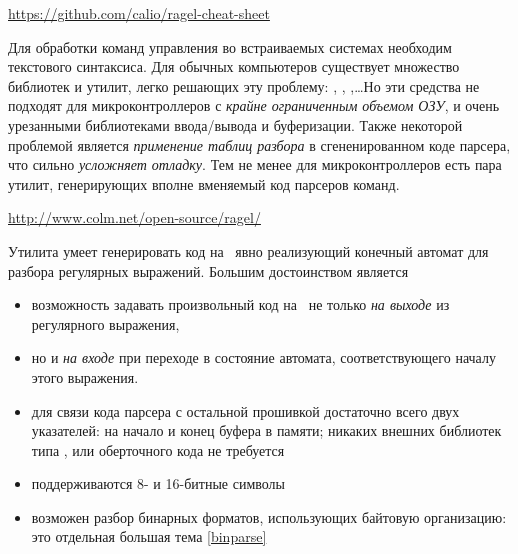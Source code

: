 \label{ragel}

\url{https://github.com/calio/ragel-cheat-sheet}

\bigskip
Для обработки команд управления во встраиваемых системах необходим
 текстового синтаксиса. Для обычных компьютеров существует
множество библиотек и утилит, легко решающих эту проблему: ,
, ,\ldots Но эти средства не подходят для
микроконтроллеров с \emph{крайне ограниченным объемом ОЗУ}, и очень урезанными библиотеками ввода/вывода и буферизации.
Также некоторой проблемой является \emph{применение таблиц разбора} в
сгененированном коде парсера, что сильно \emph{усложняет отладку}. Тем не менее
для микроконтроллеров есть пара утилит, генерирующих вполне вменяемый код
парсеров команд.

\clearpage
\url{http://www.colm.net/open-source/ragel/}

\bigskip
Утилита  умеет генерировать код на \emc\ явно реализующий конечный
автомат для разбора регулярных выражений. Большим достоинством является
\begin{itemize}[nosep]
\item
возможность задавать произвольный код на \emc\ не только \emph{на выходе} из
регулярного выражения,
\item
но и \emph{на входе} при переходе в состояние автомата, соответствующего началу
этого выражения.
\item 
для связи кода парсера с остальной прошивкой достаточно всего двух указателей:
на начало и конец буфера в памяти; никаких внешних библиотек типа ,
или оберточного кода не требуется
\item 
поддерживаются 8- и 16-битные символы 
\item
возможен разбор бинарных форматов, использующих байтовую организацию:
 это отдельная большая тема
\ref{binparse}
\end{itemize}

